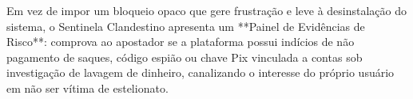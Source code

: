 Em vez de impor um bloqueio opaco que gere frustra\c{c}\~{a}o e leve \`{a} desinstala\c{c}\~{a}o do sistema, o Sentinela Clandestino apresenta um **Painel de Evid\^{e}ncias de Risco**: comprova ao apostador se a plataforma possui ind\'{i}cios de n\~{a}o pagamento de saques, c\'{o}digo espi\~{a}o ou chave Pix vinculada a contas sob investiga\c{c}\~{a}o de lavagem de dinheiro, canalizando o interesse do pr\'{o}prio usu\'{a}rio em n\~{a}o ser v\'{i}tima de estelionato.
